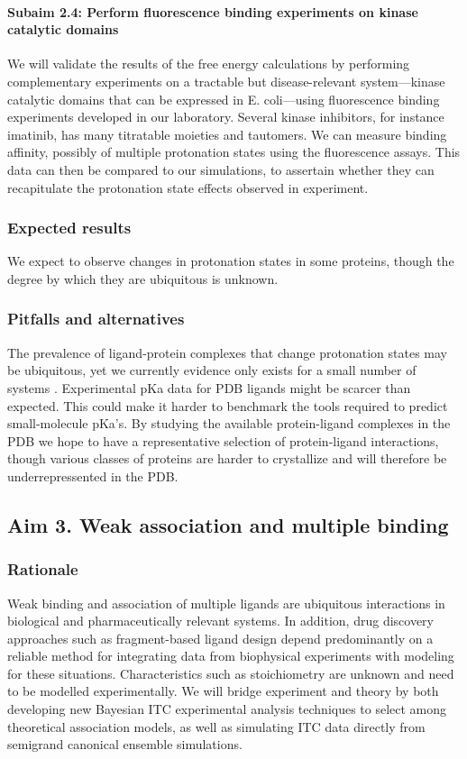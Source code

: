 \documentclass[10pt]{article}
\newcommand{\subsubsubsection}[1]{\paragraph*{#1}}
\begin{document}
\subsubsubsection{Subaim 2.4: Perform fluorescence binding experiments on kinase catalytic domains}
We will validate the results of the free energy calculations by performing complementary experiments on a tractable but disease-relevant system---kinase catalytic domains that can be expressed in E. coli---using fluorescence binding experiments developed in our laboratory. Several kinase inhibitors, for instance imatinib, has many titratable moieties and tautomers. We can measure binding affinity, possibly of multiple protonation states using the fluorescence assays. This data can then be compared to our simulations, to assertain whether they can recapitulate the protonation state effects observed in experiment.
\subsubsection*{Expected results}
We expect to observe changes in protonation states in some proteins, though the degree by which they are ubiquitous is unknown. 
\subsubsection*{Pitfalls and alternatives}
The prevalence of ligand-protein complexes that change protonation states may be ubiquitous, yet we currently evidence only exists for a small number of systems \cite{Aleksandrov2007a,Czodrowski2007a}.
Experimental pKa data for PDB ligands might be scarcer than expected. This could make it harder to benchmark the tools required to predict small-molecule pKa's.
By studying the available protein-ligand complexes in the PDB we hope to have a representative selection of protein-ligand interactions, though various classes of proteins are harder to crystallize and will therefore be underrepressented in the PDB.

		
\subsection*{Aim 3. Weak association and multiple binding}
\subsubsection*{Rationale}
Weak binding and association of multiple ligands are ubiquitous interactions in biological and pharmaceutically relevant systems.
In addition, drug discovery approaches such as fragment-based ligand design depend predominantly on a reliable method for integrating data from biophysical experiments with modeling for these situations. Characteristics such as stoichiometry are unknown and need to be modelled experimentally.
We will bridge experiment and theory by both developing new Bayesian ITC experimental analysis techniques to select among theoretical association models, as well as simulating ITC data directly from semigrand canonical ensemble simulations.
\end{document}
